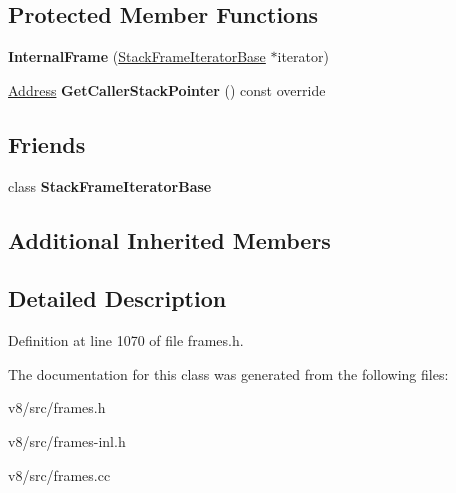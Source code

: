 \subsection*{Protected Member Functions}
\begin{DoxyCompactItemize}
\item 
\mbox{\label{classv8_1_1internal_1_1InternalFrame_a9bdd4bb2a9b9f4806cd69cd78b11b438}} 
{\bfseries Internal\+Frame} (\mbox{\hyperlink{classv8_1_1internal_1_1StackFrameIteratorBase}{Stack\+Frame\+Iterator\+Base}} $\ast$iterator)
\item 
\mbox{\label{classv8_1_1internal_1_1InternalFrame_adcc31c462e39965dc97833caaec1683e}} 
\mbox{\hyperlink{classuintptr__t}{Address}} {\bfseries Get\+Caller\+Stack\+Pointer} () const override
\end{DoxyCompactItemize}
\subsection*{Friends}
\begin{DoxyCompactItemize}
\item 
\mbox{\label{classv8_1_1internal_1_1InternalFrame_ac7310421866976ca454bbe11c5f926c3}} 
class {\bfseries Stack\+Frame\+Iterator\+Base}
\end{DoxyCompactItemize}
\subsection*{Additional Inherited Members}


\subsection{Detailed Description}


Definition at line 1070 of file frames.\+h.



The documentation for this class was generated from the following files\+:\begin{DoxyCompactItemize}
\item 
v8/src/frames.\+h\item 
v8/src/frames-\/inl.\+h\item 
v8/src/frames.\+cc\end{DoxyCompactItemize}
